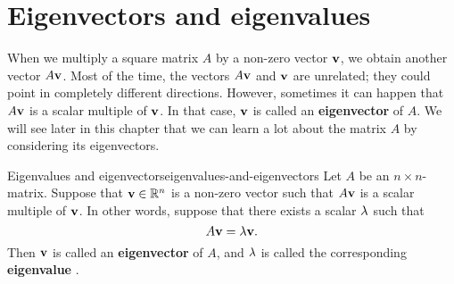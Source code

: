\section{Eigenvectors and eigenvalues}

When we multiply a square matrix $A$ by a non-zero vector $\mbox{\bf v}$,
we obtain another vector $A\mbox{\bf v}$. Most of the time, the vectors
$A\mbox{\bf v}$ and $\mbox{\bf v}$ are unrelated; they could point in
completely different directions. However, sometimes it can happen that
$A\mbox{\bf v}$ is a scalar multiple of $\mbox{\bf v}$. In that case,
$\mbox{\bf v}$ is called an \textbf{eigenvector} of $A$. We will see later
in this chapter that we can learn a lot about the matrix $A$ by
considering its eigenvectors.

\begin{definition}{Eigenvalues and eigenvectors}{eigenvalues-and-eigenvectors}
  Let $A$ be an $n\times n$-matrix. Suppose that $\mbox{\bf v}\in\mathbb{R}^n$ is
  a non-zero vector such that $A\mbox{\bf v}$ is a scalar multiple of
  $\mbox{\bf v}$. In other words, suppose that there exists a scalar
  $\lambda$ such that
  \begin{equation}\label{eigen1}
    A\mbox{\bf v}=\lambda\mbox{\bf v}.
  \end{equation}
  Then $\mbox{\bf v}$ is called an \textbf{eigenvector}%
   of $A$, and $\lambda$ is called the
  corresponding \textbf{eigenvalue}%
  .
\end{definition}

